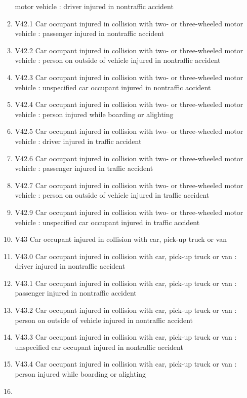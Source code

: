 \documentclass[
]{scrartcl}
\begin{document}
\begin{itemize}
\begin{enumerate}
    motor vehicle : driver injured in nontraffic accident
  \item
    V42.1 Car occupant injured in collision with two- or three-wheeled
    motor vehicle : passenger injured in nontraffic accident
  \item
    V42.2 Car occupant injured in collision with two- or three-wheeled
    motor vehicle : person on outside of vehicle injured in nontraffic
    accident
  \item
    V42.3 Car occupant injured in collision with two- or three-wheeled
    motor vehicle : unspecified car occupant injured in nontraffic
    accident
  \item
    V42.4 Car occupant injured in collision with two- or three-wheeled
    motor vehicle : person injured while boarding or alighting
  \item
    V42.5 Car occupant injured in collision with two- or three-wheeled
    motor vehicle : driver injured in traffic accident
  \item
    V42.6 Car occupant injured in collision with two- or three-wheeled
    motor vehicle : passenger injured in traffic accident
  \item
    V42.7 Car occupant injured in collision with two- or three-wheeled
    motor vehicle : person on outside of vehicle injured in traffic
    accident
  \item
    V42.9 Car occupant injured in collision with two- or three-wheeled
    motor vehicle : unspecified car occupant injured in traffic accident
  \item
    V43 Car occupant injured in collision with car, pick-up truck or van
  \item
    V43.0 Car occupant injured in collision with car, pick-up truck or
    van : driver injured in nontraffic accident
  \item
    V43.1 Car occupant injured in collision with car, pick-up truck or
    van : passenger injured in nontraffic accident
  \item
    V43.2 Car occupant injured in collision with car, pick-up truck or
    van : person on outside of vehicle injured in nontraffic accident
  \item
    V43.3 Car occupant injured in collision with car, pick-up truck or
    van : unspecified car occupant injured in nontraffic accident
  \item
    V43.4 Car occupant injured in collision with car, pick-up truck or
    van : person injured while boarding or alighting
  \item

\end{enumerate}
\end{itemize}
\end{document}
